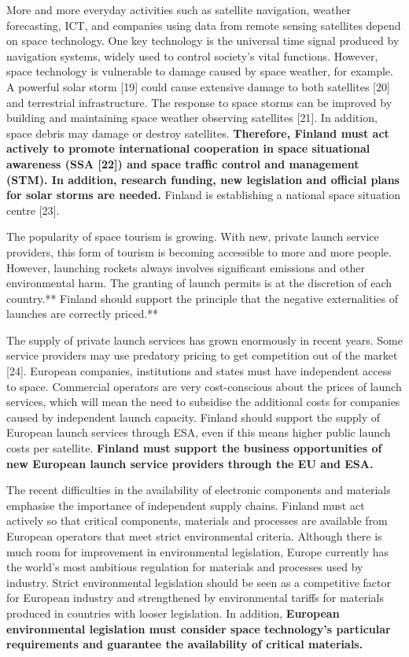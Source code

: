 More and more everyday activities such as satellite navigation, weather
forecasting, ICT, and companies using data from remote sensing
satellites depend on space technology. One key technology is the
universal time signal produced by navigation systems, widely used to
control society's vital functions. However, space technology is
vulnerable to damage caused by space weather, for example. A powerful
solar storm {[}19{]} could cause extensive damage to both satellites
{[}20{]} and terrestrial infrastructure. The response to space storms
can be improved by building and maintaining space weather observing
satellites {[}21{]}. In addition, space debris may damage or destroy
satellites. \textbf{Therefore, Finland must act actively to promote
international cooperation in space situational awareness (SSA {[}22{]})
and space traffic control and management (STM). In addition, research
funding, new legislation and official plans for solar storms are
needed.} Finland is establishing a national space situation centre
{[}23{]}.

The popularity of space tourism is growing. With new, private launch
service providers, this form of tourism is becoming accessible to more
and more people. However, launching rockets always involves significant
emissions and other environmental harm. The granting of launch permits
is at the discretion of each country.** Finland should support the
principle that the negative externalities of launches are correctly
priced.**

The supply of private launch services has grown enormously in recent
years. Some service providers may use predatory pricing to get
competition out of the market {[}24{]}. European companies, institutions
and states must have independent access to space. Commercial operators
are very cost-conscious about the prices of launch services, which will
mean the need to subsidise the additional costs for companies caused by
independent launch capacity. Finland should support the supply of
European launch services through ESA, even if this means higher public
launch costs per satellite. \textbf{Finland must support the business
opportunities of new European launch service providers through the EU
and ESA.}

The recent difficulties in the availability of electronic components and
materials emphasise the importance of independent supply chains. Finland
must act actively so that critical components, materials and processes
are available from European operators that meet strict environmental
criteria. Although there is much room for improvement in environmental
legislation, Europe currently has the world's most ambitious regulation
for materials and processes used by industry. Strict environmental
legislation should be seen as a competitive factor for European industry
and strengthened by environmental tariffs for materials produced in
countries with looser legislation. In addition, \textbf{European
environmental legislation must consider space technology's particular
requirements and guarantee the availability of critical materials.}

